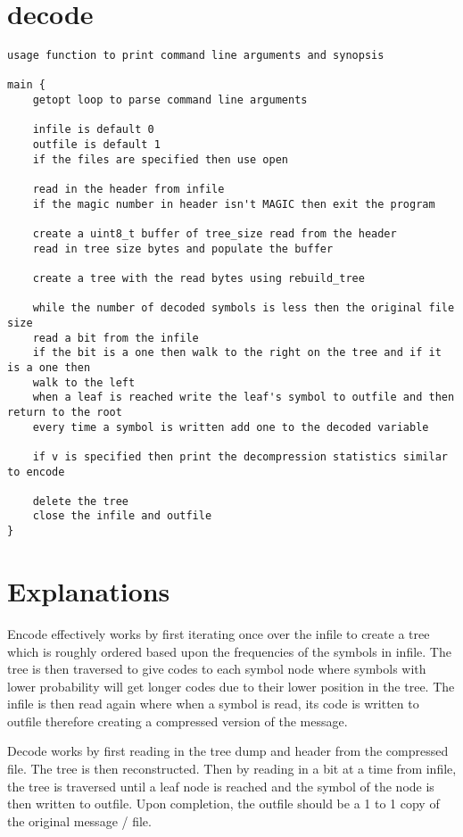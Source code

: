 \documentclass[11pt]{article}
\begin{document}
\section{decode}
\begin{verbatim}
usage function to print command line arguments and synopsis

main {
    getopt loop to parse command line arguments
    
    infile is default 0
    outfile is default 1
    if the files are specified then use open
    
    read in the header from infile
    if the magic number in header isn't MAGIC then exit the program
    
    create a uint8_t buffer of tree_size read from the header
    read in tree size bytes and populate the buffer
    
    create a tree with the read bytes using rebuild_tree
    
    while the number of decoded symbols is less then the original file size
    read a bit from the infile
    if the bit is a one then walk to the right on the tree and if it is a one then
    walk to the left
    when a leaf is reached write the leaf's symbol to outfile and then return to the root
    every time a symbol is written add one to the decoded variable
    
    if v is specified then print the decompression statistics similar to encode
    
    delete the tree
    close the infile and outfile
}
\end{verbatim}

\section{Explanations}
Encode effectively works by first iterating once over the infile to create a tree which is roughly ordered based upon the frequencies of the symbols in infile. The tree is then traversed to give codes to each symbol node where symbols with lower probability will get longer codes due to their lower position in the tree. The infile is then read again where when a symbol is read, its code is written to outfile therefore creating a compressed version of the message.

Decode works by first reading in the tree dump and header from the compressed file. The tree is then reconstructed. Then by reading in a bit at a time from infile, the tree is traversed until a leaf node is reached and the symbol of the node is then written to outfile. Upon completion, the outfile should be a 1 to 1 copy of the original message / file.
\end{document}

